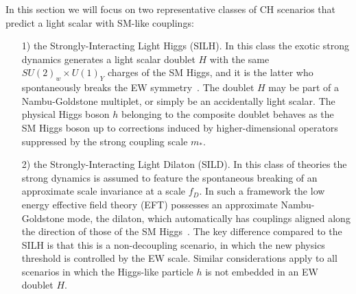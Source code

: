 In this section we will focus on two representative classes of CH scenarios that predict a light scalar with SM-like couplings:
\begin{itemize}
\item[1)] the Strongly-Interacting Light Higgs (SILH). In this class the exotic strong dynamics generates a light scalar doublet $H$ with the same $SU(2)_w\times U(1)_Y$ charges of the SM Higgs, and it is the latter who spontaneously breaks the EW symmetry~\cite{Giudice:2007fh}. The doublet $H$ may be part of a Nambu-Goldstone multiplet, or simply be an accidentally light scalar. The physical Higgs boson $h$ belonging to the composite doublet behaves as the SM Higgs boson up to corrections induced by higher-dimensional operators suppressed by the strong coupling scale $m_*$. 
\item[2)] the Strongly-Interacting Light Dilaton (SILD). In this class of theories the strong dynamics is assumed to feature the spontaneous breaking of an approximate scale invariance at a scale $f_D$. In such a framework the low energy effective field theory (EFT) possesses an approximate Nambu-Goldstone mode, the dilaton, which automatically has couplings aligned along the direction of those of the SM Higgs~\cite{Goldberger:2008zz}. The key difference compared to the SILH is that this is a non-decoupling scenario, in which the new physics threshold is controlled by the EW scale. %
{Similar considerations apply to all scenarios in which the Higgs-like particle $h$ is not embedded in an EW doublet $H$.} %
\end{itemize}





